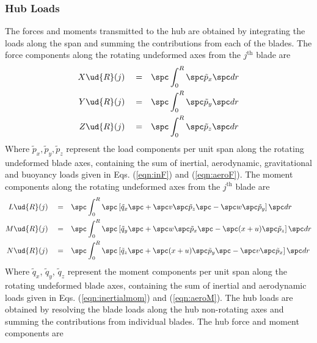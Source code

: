 \subsubsection{Hub Loads}
\label{sec:hubloads}
The forces and moments transmitted to the hub are obtained by integrating the loads along the span and summing the contributions from each of the blades. The force components along the rotating undeformed axes from the $j^\textrm{th}$ blade are 
\begin{align*}
X\ud{R}(j) \quad = \quad &\spc \int_0^R \spc  \tilde{p}_x \spc dr \\
Y\ud{R}(j) \quad = \quad &\spc \int_0^R \spc  \tilde{p}_y \spc dr \\
Z\ud{R}(j) \quad = \quad &\spc \int_0^R \spc  \tilde{p}_z \spc dr 
\end{align*}
Where $\tilde{p}_x, \tilde{p}_y, \tilde{p}_z$ represent the load components per unit span along the rotating undeformed blade axes, containing the sum of inertial, aerodynamic, gravitational and buoyancy loads given in Eqs. (\ref{eqn:inF}) and (\ref{eqn:aeroF}). The moment components along the rotating undeformed axes from the $j^\textrm{th}$ blade are 
\begin{align*}
L\ud{R}(j) \quad = \quad &\spc \int_0^R \spc \left[ \tilde{q}_x \spc + \spc v \spc \tilde{p}_z \spc - \spc w \spc \tilde{p}_y \right] \spc dr \\
M\ud{R}(j) \quad = \quad &\spc \int_0^R \spc \left[ \tilde{q}_y \spc + \spc w \spc \tilde{p}_x \spc - \spc (x+u) \spc \tilde{p}_z \right] \spc dr \\
N\ud{R}(j) \quad = \quad &\spc \int_0^R \spc \left[ \tilde{q}_z \spc + \spc (x+u) \spc \tilde{p}_y \spc - \spc v \spc \tilde{p}_x \right] \spc dr 
\end{align*}
Where $\tilde{q}_x$, $\tilde{q}_y$, $\tilde{q}_z$ represent the moment components per unit span along the rotating undeformed blade axes, containing the sum of inertial and aerodynamic loads given in Eqs. (\ref{eqn:inertialmom}) and (\ref{eqn:aeroM}). The hub loads are obtained by resolving the blade loads along the hub non-rotating axes and summing the contributions from individual blades. The hub force and moment components are 
